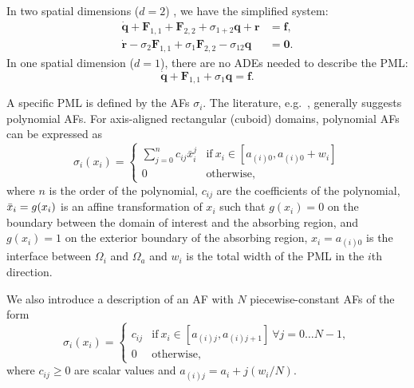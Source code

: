 \documentclass[a4paper]{article}
\renewcommand{\vec}{\boldsymbol}
\begin{document}
In two spatial dimensions ($d = 2$) , we have the simplified system:
\begin{equation}
  \begin{aligned}
    \Dot{\vec{q}} + \vec{F}_{1, 1} + \vec{F}_{2, 2} +
    \sigma_{1+2}\vec{q} +\vec{r}
    &= \vec{f},
    \\
    \Dot{\vec{r}} - \sigma_2\vec{F}_{1,1} +
    \sigma_1\vec{F}_{2, 2} - \sigma_{12}\vec{q}
    &= \vec{0}.
  \end{aligned}
  \label{eq:2dfullpml}
\end{equation}
In one spatial dimension ($d = 1$), there are no ADEs needed to
describe the PML:
\begin{equation}
  \Dot{\vec{q}} + \vec{F}_{1, 1} + \sigma_1\vec{q} = \vec{f}.
  \label{eq:1dfullpml}
\end{equation}

A specific PML is defined by the AFs $\sigma_i$. The literature,
e.g.~\citep{chew96jin}, generally suggests polynomial AFs. For
axis-aligned rectangular (cuboid) domains, polynomial AFs can be
expressed as
\begin{equation}
  \sigma_{i}(x_{i})
  =
  \begin{cases}
    \displaystyle\sum_{j = 0}^{n}c_{ij} \bar{x}_{i}^{j}
    & \text{if} \ x_{i} \in [a_{(i)0}, a_{(i)0}+w_i]
    \\
    0 &\text{otherwise},
  \end{cases}
  \label{eq:polyaf}
\end{equation}
where $n$ is the order of the polynomial, $c_{ij}$ are the
coefficients of the polynomial, $\Bar{x}_{i} = g(x_{i})$ is an affine
transformation of $x_i$ such that $g(x_{i}) = 0$ on the boundary
between the domain of interest and the absorbing region, and $g(x_{i})
= 1$ on the exterior boundary of the absorbing region, $x_i =
a_{(i)0}$ is the interface between $\Omega_i$ and $\Omega_a$ and $w_i$
is the total width of the PML in the $i$th direction.

We also introduce a description of an AF with $N$ piecewise-constant
AFs of the form
\begin{equation}
  \sigma_i(x_i)
  =
  \begin{cases}
    c_{ij} & \text{if} \ x_{i} \in [a_{(i)j}, a_{(i)j+1}] \
    \forall j = 0 \ldots N - 1,
    \\
    0     & \text{otherwise},
  \end{cases}
  \label{eq:pwcaf}
\end{equation}
where $c_{ij} \ge 0$ are scalar values and $a_{(i)j} = a_{i} +
j(w_{i}/N)$.
\end{document}
